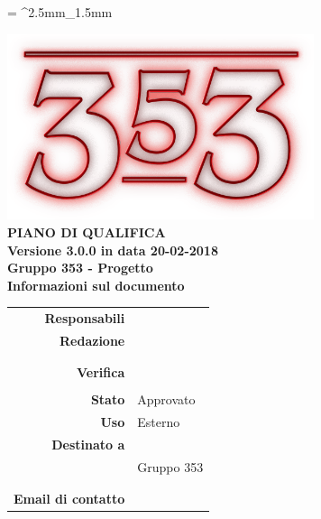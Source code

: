 \documentclass[openany, a4paper, 12pt]{report}
\begin{document}
	
	\tabulinesep = ^2.5mm_1.5mm
	
	\begin{titlepage}
		\centering
		\vfill
		{
			\bfseries
			\vskip2cm
			\includegraphics[width=9cm]{../../common/images/logo.png} \\
			\vfill
			\Huge{PIANO DI QUALIFICA}\\
			\vfill
			\Large Versione 3.0.0 in data 20-02-2018\\ 
			\large Gruppo 353 - Progetto \progetto \\
			\vfill
			\normalsize Informazioni sul documento\\
			\begin{table}[htbp]
				\centering
				\renewcommand\arraystretch{1.2}
				\begin{tabular}{r|l}
					\hline
					\textbf{Responsabili}	& \Parwinder \\
					
					\textbf{Redazione} 		& \Elena \\
											& \Gianluca \\
											& \Valentina \\
											
					\textbf{Verifica} 		& \Riccardo \\	
											& \Davide \\
											
					\textbf{Stato} 			& Approvato\\
					\textbf{Uso}			& Esterno\\
				\textbf{Destinato a}   	& \Proponente\\
										& Gruppo 353\\
										& \Vardanega\\
										& \Cardin\\
					
					\textbf{Email di contatto}	& \mailgroup
				\end{tabular}
			\end{table}
			\vfill
		}    
	\end{titlepage}
	
	\tableofcontents
	\listoftables
	\newpage
	
	
	
	
	
	\appendix
	
	
	
	
	
\end{document}
